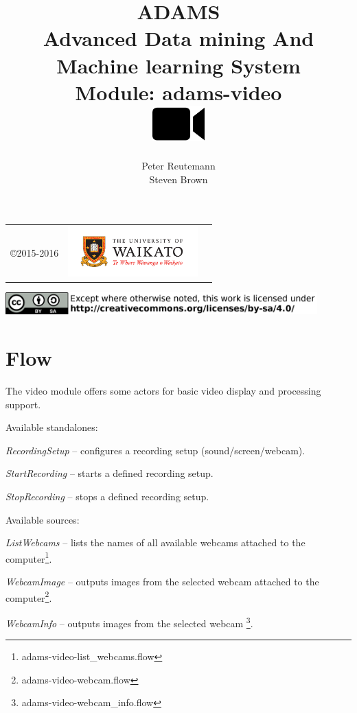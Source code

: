 \documentclass[a4paper]{book}
\title{
  \textbf{ADAMS} \\
  {\Large \textbf{A}dvanced \textbf{D}ata mining \textbf{A}nd \textbf{M}achine
  learning \textbf{S}ystem} \\
  {\Large Module: adams-video} \\
  \vspace{1cm}
  \includegraphics[width=2cm]{images/video-module.png} \\
}
\author{
  Peter Reutemann \\
  Steven Brown
}
\begin{document}
\begin{titlepage}
\maketitle

\thispagestyle{empty}
\center
\begin{table}[b]
	\begin{tabular}{c l l}
		\parbox[c][2cm]{2cm}{\copyright 2015-2016} &
		\parbox[c][2cm]{5cm}{\includegraphics[width=5cm]{images/coat_of_arms.pdf}} \\
	\end{tabular}
	\includegraphics[width=12cm]{images/cc.png} \\
\end{table}

\end{titlepage}

\tableofcontents
\listoffigures

\chapter{Flow}
The video module offers some actors for basic video display and processing support.

\noindent Available standalones:
\begin{tight_itemize}
    \item \textit{RecordingSetup} -- configures a recording setup (sound/screen/webcam).
    \item \textit{StartRecording} -- starts a defined recording setup.
    \item \textit{StopRecording} -- stops a defined recording setup.
\end{tight_itemize}

\noindent Available sources:
\begin{tight_itemize}
    \item \textit{ListWebcams} -- lists the names of all available webcams
    attached to the computer\footnote{adams-video-list\_webcams.flow}.
    \item \textit{WebcamImage} -- outputs images from the selected webcam
    attached to the computer\footnote{adams-video-webcam.flow}.
    \item \textit{WebcamInfo} -- outputs images from the selected webcam
    \footnote{adams-video-webcam\_info.flow}.
\end{tight_itemize}
\end{document}
